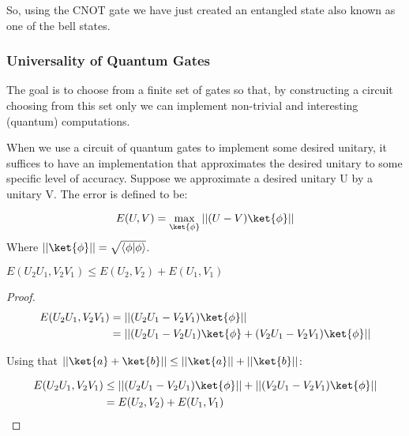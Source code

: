 So, using the CNOT gate we have just created an entangled state also known as one of the bell states.

\subsubsection{Universality of Quantum Gates}
\label{Subsubsec: Universality of Quantum Gates}
The goal is to choose from a finite set of gates so that, by constructing a circuit choosing from this set only we can implement non-trivial and interesting (quantum) computations.

When we use a circuit of quantum gates to implement some desired unitary, it suffices to have an implementation that approximates the desired unitary to some specific level of accuracy. Suppose we approximate a desired unitary U by a unitary V. The error is defined to be:

\begin{equation}
    \label{Eq: Unitary Error}
    E(U,V) = \max_{\ket{\phi}} || (U-V)\ket{\phi}||
\end{equation}
Where $||\ket{\phi}|| = \sqrt{\ip{\phi}{\phi}}$.

\begin{theorem}
$E(U_2U_1, V_2V_1) \leq E(U_2,V_2) + E(U_1,V_1)$
\end{theorem}

\begin{proof}
\begin{equation}
    \begin{split}
        E(U_2U_1, V_2V_1) & = || (U_2U_1 - V_2V_1) \ket{\phi}|| \\
        &  = || (U_2U_1 - V_2U_1) \ket{\phi} + (V_2U_1 - V_2V_1) \ket{\phi}||
    \end{split}
\end{equation}

Using that $|| \ket{a} + \ket{b} || \leq || \ket{a} || + || \ket{b} ||$:

\begin{equation}
    \begin{split}
        E(U_2U_1, V_2V_1) & \leq || (U_2U_1 - V_2U_1) \ket{\phi} || + ||(V_2U_1 - V_2V_1) \ket{\phi}|| \\
        & = E(U_2,V_2) + E(U_1,V_1)
    \end{split}
\end{equation}
\qedsymbol
\end{proof}
